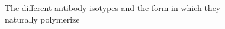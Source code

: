 \begin{figure}[H]
\begin{minipage}{0.35\textwidth}
        \caption{The different antibody isotypes and the form in which they naturally polymerize}
        \label{fig:antibody_classes}
    \end{minipage}
\end{figure}
